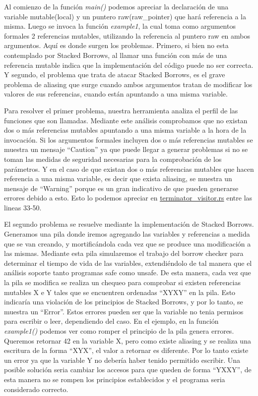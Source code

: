 Al comienzo de la función \textit{main()} podemos apreciar la declaración de una variable mutable(local) y un puntero raw(raw\_pointer) que hará referencia a la misma. Luego se invoca la función \textit{example1}, la cual toma como argumentos formales 2 referencias mutables, utilizando la referencia al puntero raw en ambos argumentos. Aquí es donde surgen los problemas. Primero, si bien no esta contemplado por Stacked Borrows, al llamar una función con más de una referencia mutable indica que la implementación del código puede no ser correcta. Y segundo, el problema que trata de atacar Stacked Borrows, es el grave problema de aliasing que surge cuando ambos argumentos tratan de modificar los valores de sus referencias, cuando están apuntando a una misma variable.

Para resolver el primer problema, nuestra herramienta analiza el perfil de las funciones que son llamadas. Mediante este análisis comprobamos que no existan dos o más referencias mutables apuntando a una misma variable a la hora de la invocación. Si los argumentos formales incluyen dos o más referencias mutables se muestra un mensaje ``Caution'' ya que puede llegar a generar problemas si no se toman las medidas de seguridad necesarias para la comprobación de los parámetros. Y en el caso de que existan dos o más referencias mutables que hacen referencia a una misma variable, es decir que exista aliasing, se muestra un mensaje de ``Warning'' porque es un gran indicativo de que pueden generarse errores debido a esto. Esto lo podemos apreciar en \href{run:../src/mir_visitor/terminator_visitor.rs}{terminator\_visitor.rs} entre las lineas 33-50.

El segundo problema se resuelve mediante la implementación de Stacked Borrows. Generamos una pila donde iremos agregando las variables y referencias a medida que se van creando, y mortificándola cada vez que se produce una modificación a las mismas. Mediante esta pila simularemos el trabajo del borrow checker para determinar el tiempo de vida de las variables, extendiéndolo de tal manera que el análisis soporte tanto programas safe como unsafe.
De esta manera, cada vez que la pila se modifica se realiza un chequeo para comprobar si existen referencias mutables X e Y tales que se encuentren ordenadas ``XYXY'' en la pila. Esto indicaría una violación de los principios de Stacked Borrows, y por lo tanto, se muestra un ``Error''. Estos errores pueden ser que la variable no tenia permisos para escribir o leer, dependiendo del caso. En el ejemplo, en la función \textit{example1()} podemos ver como romper el principio de la pila genera errores. Queremos retornar 42 en la variable X, pero como existe aliasing y se realiza una escritura de la forma ``XYX'', el valor a retornar es diferente. Por lo tanto existe un error ya que la variable Y no debería haber tenido permitido escribir. Una posible solución seria cambiar los accesos para que queden de forma ``YXXY'', de esta manera no se rompen los principios establecidos y el programa seria considerado correcto.

